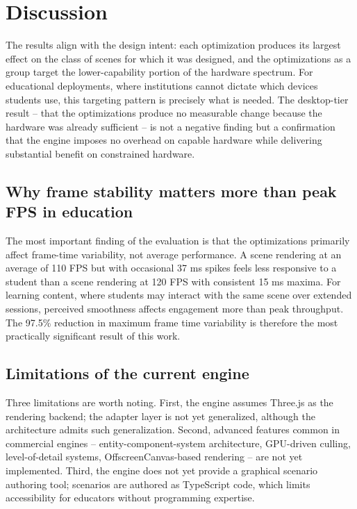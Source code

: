 \section{Discussion}
The results align with the design intent: each optimization produces its largest effect on the class of scenes for which it was designed, and the optimizations as a group target the lower-capability portion of the hardware spectrum. For educational deployments, where institutions cannot dictate which devices students use, this targeting pattern is precisely what is needed. The desktop-tier result -- that the optimizations produce no measurable change because the hardware was already sufficient -- is not a negative finding but a confirmation that the engine imposes no overhead on capable hardware while delivering substantial benefit on constrained hardware.

\subsection{Why frame stability matters more than peak FPS in education}
The most important finding of the evaluation is that the optimizations primarily affect frame-time variability, not average performance. A scene rendering at an average of 110 FPS but with occasional 37 ms spikes feels less responsive to a student than a scene rendering at 120 FPS with consistent 15 ms maxima. For learning content, where students may interact with the same scene over extended sessions, perceived smoothness affects engagement more than peak throughput. The 97.5\% reduction in maximum frame time variability is therefore the most practically significant result of this work.

\subsection{Limitations of the current engine}
Three limitations are worth noting. First, the engine assumes Three.js as the rendering backend; the adapter layer is not yet generalized, although the architecture admits such generalization. Second, advanced features common in commercial engines -- entity-component-system architecture, GPU-driven culling, level-of-detail systems, OffscreenCanvas-based rendering -- are not yet implemented. Third, the engine does not yet provide a graphical scenario authoring tool; scenarios are authored as TypeScript code, which limits accessibility for educators without programming expertise.